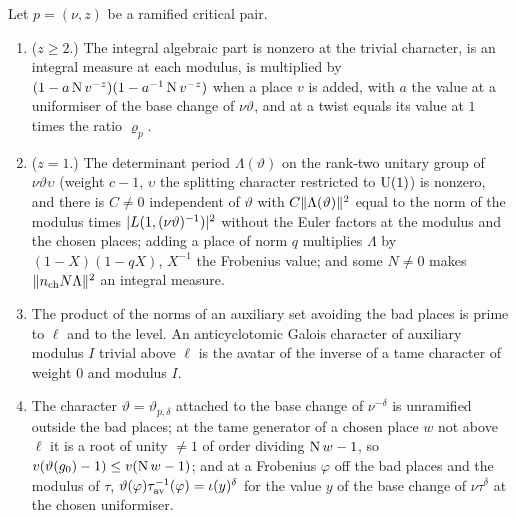 \begin{lemma}\label{lem:class-sums}
Let $p=(\nu,z)$ be a ramified critical pair.
\begin{enumerate}[label=\textup{(\alph*)}]
\item ($z\ge2$.) The integral algebraic part is nonzero at the trivial character, is an integral measure at each modulus, is multiplied by $(1-a\operatorname{N} v^{-z})(1-a^{-1}\operatorname{N} v^{-z})$ when a place $v$ is added, with $a$ the value at a uniformiser of the base change of $\nu\vartheta$, and at a twist equals its value at $1$ times the ratio $\varrho_p$.
\item ($z=1$.) The determinant period $\Lambda(\vartheta)$ on the rank-two unitary group of $\nu\vartheta\upsilon$ (weight $c-1$, $\upsilon$ the splitting character restricted to $\operatorname{U}(1)$) is nonzero, and there is $C\ne0$ independent of $\vartheta$ with $C\lVert \Lambda(\vartheta)\rVert^2$ equal to the norm of the modulus times $\lvert L(1,(\nu\vartheta)^{-1})\rvert^2$ without the Euler factors at the modulus and the chosen places; adding a place of norm $q$ multiplies
$\Lambda$ by $(1-X)(1-qX)$, $X^{-1}$ the Frobenius value; and some $N\ne0$ makes $\lVert n_{\rm ch}N\Lambda\rVert^2$ an integral measure.
\item The product of the norms of an auxiliary set avoiding the bad places is prime to $\ell$ and to the level. An anticyclotomic Galois character of auxiliary modulus $I$ trivial above $\ell$ is the avatar of the inverse of a tame character of weight $0$ and modulus $I$.
\item The character $\vartheta=\vartheta_{p,\delta}$ attached to the base change of $\nu^{-\delta}$ is unramified outside the bad places; at the tame generator of a chosen place $w$ not above $\ell$ it is a root of unity $\ne1$ of order dividing $\operatorname{N} w-1$, so $v(\vartheta(g_0)-1)\le v(\operatorname{N} w-1)$; and at a Frobenius $\varphi$ off the bad places and the modulus of $\tau$,
$\vartheta(\varphi)\tau^{-1}_{\rm av}(\varphi)=\iota(y)^\delta$ for the value $y$ of the base change of $\nu\tau^\delta$ at the chosen uniformiser.
\end{enumerate}
\end{lemma}


